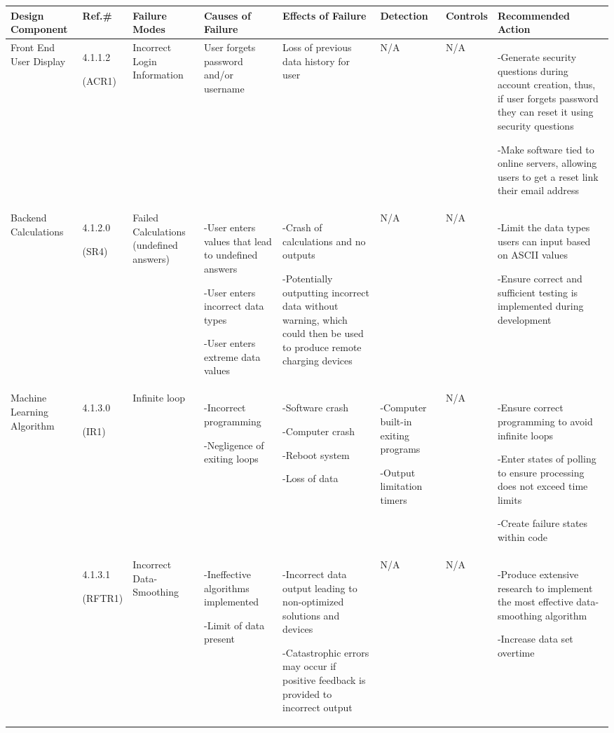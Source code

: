 \documentclass[12pt, titlepage]{article}
\begin{document}
\begin{center}
\begin{adjustwidth}{-3.5cm}{}
\begin{tabular}{|p{1.5cm}|p{1.4cm}|p{1.8cm}|p{2cm}|p{3.5cm}|p{1.7cm}|p{1.5cm}|p{4.2cm}|}
\hline
Design Component & Ref.\# & Failure Modes & Causes of Failure & Effects of Failure & Detection & Controls & Recommended Action\\
\hline
Front End User Display & 4.1.1.2 \par(ACR1)& Incorrect Login Information & User forgets password and/or username & Loss of previous data history for user & N/A & N/A & -Generate security questions during account creation, thus, if user forgets password they can reset it using security questions \par -Make software tied to online servers, allowing users to get a reset link their email address\\
 \hline
 Backend Calculations & 4.1.2.0 \par(SR4)& Failed Calculations (undefined answers) & -User enters values that lead to undefined answers \par -User enters incorrect data types \par -User enters extreme data values & -Crash of calculations and no outputs \par -Potentially outputting incorrect data without warning, which could then be used to produce remote charging devices & N/A & N/A & -Limit the data types users can input based on ASCII values \par -Ensure correct and sufficient testing is implemented during development\\
 \hline
 Machine Learning Algorithm & 4.1.3.0  \par (IR1)& Infinite loop & -Incorrect programming \par -Negligence of exiting loops & -Software crash \par -Computer crash \par -Reboot system \par -Loss of data & -Computer built-in exiting programs \par -Output limitation timers & N/A & -Ensure correct programming to avoid infinite loops \par -Enter states of polling to ensure processing does not exceed time limits \par -Create failure states within code\\
 & 4.1.3.1 \par(RFTR1) & Incorrect Data-Smoothing & -Ineffective algorithms implemented \par -Limit of data present & -Incorrect data output leading to non-optimized solutions and devices \par -Catastrophic errors may occur if positive feedback is provided to incorrect output & N/A & N/A & -Produce extensive research to implement the most effective data-smoothing algorithm \par -Increase data set overtime \\
 \hline
\end{tabular}
\end{adjustwidth}
\end{center}
\end{document}

